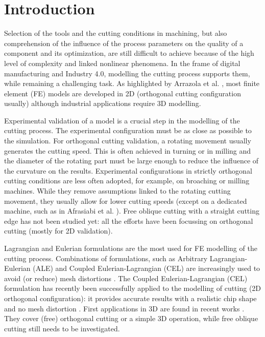 \documentclass[preprint,12pt,times]{elsarticle}
\begin{document}
\linenumbers

\section{Introduction}
\label{Intro}

Selection of the tools and the cutting conditions in machining, but also comprehension of the influence of the process parameters on the quality of a component and its optimization, are still difficult to achieve because of the high level of complexity and linked nonlinear phenomena. In the frame of digital manufacturing and Industry 4.0, modelling the cutting process supports them, while remaining a challenging task. As highlighted by Arrazola et al. \cite{arrazola_Recent_2013}, most finite element (FE) models are developed in 2D (orthogonal cutting configuration usually) although industrial applications require 3D modelling.

Experimental validation of a model is a crucial step in the modelling of the cutting process. The experimental configuration must be as close as possible to the simulation. For orthogonal cutting validation, a rotating movement usually generates the cutting speed. This is often achieved in turning \cite{agmell_Development_2018} or in milling \cite{xu_Simulation_2021} and the diameter of the rotating part must be large enough to reduce the influence of the curvature on the results. Experimental configurations in strictly orthogonal cutting conditions are less often adopted, for example, on broaching \cite{abouridouane_Friction_2021} or milling \cite{ducobu_Experimental_2015, sela_Measurement_2021} machines. While they remove assumptions linked to the rotating cutting movement, they usually allow for lower cutting speeds (except on a dedicated machine, such as in Afrasiabi et al. \cite{afrasiabi_NumericalExperimental_2021}). Free oblique cutting with a straight cutting edge has not been studied yet: all the efforts have been focussing on orthogonal cutting (mostly for 2D validation).

Lagrangian and Eulerian formulations are the most used for FE modelling of the cutting process. Combinations of formulations, such as Arbitrary Lagrangian-Eulerian (ALE) and Coupled Eulerian-Lagrangian (CEL) are increasingly used to avoid (or reduce) mesh distortions \cite{ducobu_Application_2016}. The Coupled Eulerian-Lagrangian (CEL) formulation has recently been successfully applied to the modelling of cutting (2D orthogonal configuration): it provides accurate results with a realistic chip shape and no mesh distortion \cite{ducobu_Application_2016}. First applications in 3D are found in recent works \cite{xu_Simulation_2021, ducobu_Finite_2017, ambrosio_New_2022, vovk_Finite_2020, hardt_Three_2021}. They cover (free) orthogonal cutting or a simple 3D operation, while free oblique cutting still needs to be investigated.
\end{document}
